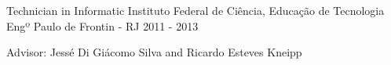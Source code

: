 \begin{cventries}
  \cventry
    {Technician in Informatic} %
    {Instituto Federal de Ciência, Educação de Tecnologia} %
    {Engº Paulo de Frontin - RJ} %
    {2011 - 2013} %
    {
      \begin{cvitems} %
        \item {Advisor: Jessé Di Giácomo Silva and Ricardo Esteves Kneipp}
      \end{cvitems}
    }

\end{cventries}
